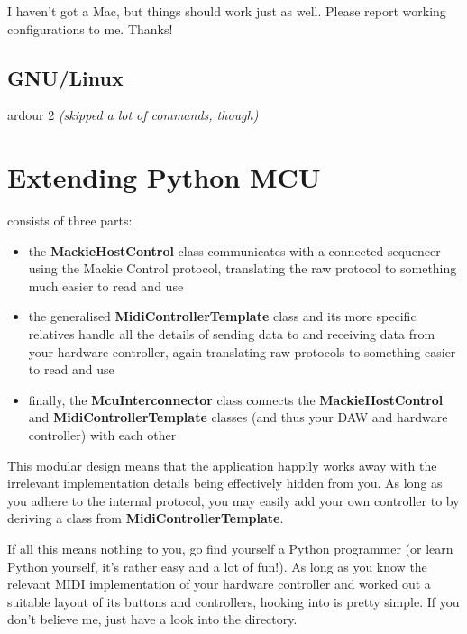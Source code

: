 I haven't got a Mac, but things should work just as well.  Please
report working configurations to me.  Thanks!

\section{GNU/Linux}

\begin{compactitem}
\item ardour 2 \emph{(skipped a lot of commands, though)}
\end{compactitem}

\chapter{Extending Python MCU}
\label{chap:extending_python_mcu}

 consists of three parts:

\begin{itemize}

\item the \textbf{MackieHostControl} class communicates with a
  connected sequencer using the Mackie Control protocol, translating
  the raw protocol to something much easier to read and use

\item the generalised \textbf{MidiControllerTemplate} class and its
  more specific relatives handle all the details of sending data to
  and receiving data from your hardware controller, again translating
  raw protocols to something easier to read and use

\item finally, the \textbf{McuInterconnector} class connects the
  \textbf{MackieHostControl} and \textbf{MidiControllerTemplate}
  classes (and thus your DAW and hardware controller) with each other

\end{itemize}

This modular design means that the application happily works away with
the irrelevant implementation details being effectively hidden from
you.  As long as you adhere to the internal protocol, you may easily
add your own controller to  by deriving a
class from \textbf{MidiControllerTemplate}.

If all this means nothing to you, go find yourself a Python programmer
(or learn Python yourself, it's rather easy and a lot of fun!).  As
long as you know the relevant MIDI implementation of your hardware
controller and worked out a suitable layout of its buttons and
controllers, hooking into  is pretty simple.
If you don't believe me, just have a look into the 
directory.






